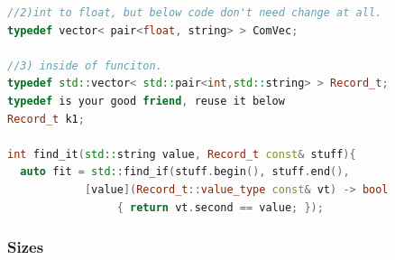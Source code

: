 \documentclass[a4paper,11pt,twoside]{book}
\begin{document}
\begin{itemize}
\begin{lstlisting}[frame=single, language=c++, mathescape=true]
//2)int to float, but below code don't need change at all.
typedef vector< pair<float, string> > ComVec;

//3) inside of funciton.
typedef std::vector< std::pair<int,std::string> > Record_t;
typedef is your good friend, reuse it below
Record_t k1;

int find_it(std::string value, Record_t const& stuff){
  auto fit = std::find_if(stuff.begin(), stuff.end(),
            [value](Record_t::value_type const& vt) -> bool
                 { return vt.second == value; });
\end{lstlisting}

\end{itemize}


\subsubsection{Sizes}
\end{document}
